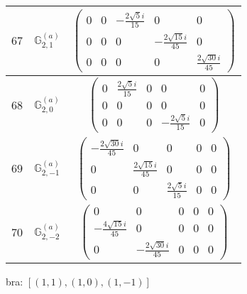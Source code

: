 \documentclass[fleqn,8pt,landscape]{jsarticle}
\begin{document}
\begin{center}
\begin{longtable}{ccc}
$ 67 $ & $ \mathbb{G}_{2,1}^{(a)} $ & $ \begin{pmatrix} 0 & 0 & - \frac{2 \sqrt{5} i}{15} & 0 & 0 \\ 0 & 0 & 0 & - \frac{2 \sqrt{15} i}{45} & 0 \\ 0 & 0 & 0 & 0 & \frac{2 \sqrt{30} i}{45} \end{pmatrix} $ \\ \hline
$ 68 $ & $ \mathbb{G}_{2,0}^{(a)} $ & $ \begin{pmatrix} 0 & \frac{2 \sqrt{5} i}{15} & 0 & 0 & 0 \\ 0 & 0 & 0 & 0 & 0 \\ 0 & 0 & 0 & - \frac{2 \sqrt{5} i}{15} & 0 \end{pmatrix} $ \\ \hline
$ 69 $ & $ \mathbb{G}_{2,-1}^{(a)} $ & $ \begin{pmatrix} - \frac{2 \sqrt{30} i}{45} & 0 & 0 & 0 & 0 \\ 0 & \frac{2 \sqrt{15} i}{45} & 0 & 0 & 0 \\ 0 & 0 & \frac{2 \sqrt{5} i}{15} & 0 & 0 \end{pmatrix} $ \\ \hline
$ 70 $ & $ \mathbb{G}_{2,-2}^{(a)} $ & $ \begin{pmatrix} 0 & 0 & 0 & 0 & 0 \\ - \frac{4 \sqrt{15} i}{45} & 0 & 0 & 0 & 0 \\ 0 & - \frac{2 \sqrt{30} i}{45} & 0 & 0 & 0 \end{pmatrix} $ \\
\end{longtable}
\end{center}
bra: $[(1,1),(1,0),(1,-1)]$
\end{document}
